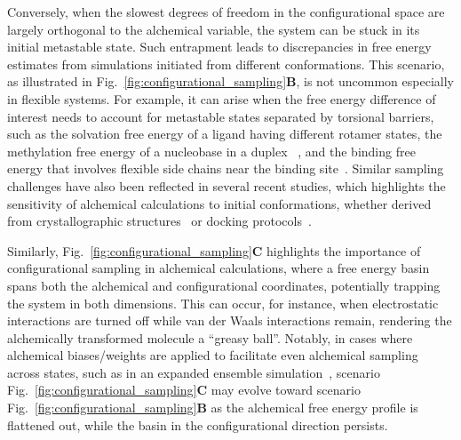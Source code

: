 \documentclass[9pt,bestpractices]{livecoms}
\begin{document}
Conversely, when the slowest degrees of freedom in the configurational space are largely orthogonal to the alchemical variable, the system can be stuck in its initial metastable state. Such entrapment leads to discrepancies in free energy estimates from simulations initiated from different conformations. This scenario, as illustrated in Fig.~\ref{fig:configurational_sampling}\textbf{B}, is not uncommon especially in flexible systems. For example, it can arise when the free energy difference of interest needs to account for metastable states separated by torsional barriers, such as the solvation free energy of a ligand having different rotamer states, the methylation free energy of a nucleobase in a duplex ~\cite{hsu2023alchemical}, and the binding free energy that involves flexible side chains near the binding site~\cite{la2022alchemical}. Similar sampling challenges have also been reflected in several recent studies, which highlights the sensitivity of alchemical calculations to initial conformations, whether derived from crystallographic structures~\cite{suruzhon2021sensitivity, baumann2024impact} or docking protocols~\cite{cappel2020impact}. 

Similarly, Fig.~\ref{fig:configurational_sampling}\textbf{C} highlights the importance of configurational sampling in alchemical calculations, where a free energy basin spans both the alchemical and configurational coordinates, potentially trapping the system in both dimensions. This can occur, for instance, when electrostatic interactions are turned off while van der Waals interactions remain, rendering the alchemically transformed molecule a ``greasy ball''. Notably, in cases where alchemical biases/weights are applied to facilitate even alchemical sampling across states, such as in an expanded ensemble simulation~\cite{lyubartsev1992new}, scenario Fig.~\ref{fig:configurational_sampling}\textbf{C} may evolve toward scenario Fig.~\ref{fig:configurational_sampling}\textbf{B} as the alchemical free energy profile is flattened out, while the basin in the configurational direction persists. 
\end{document}
